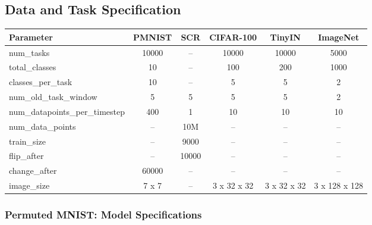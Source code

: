 \documentclass{article}
\begin{document}
\subsection{Data and Task Specification}
\vspace{2mm}
\noindent
\begin{minipage}{\columnwidth}
\centering
\footnotesize
\setlength{\tabcolsep}{3pt}

\begin{tabular}{lccccc}
\toprule
\textbf{Parameter} & \textbf{PMNIST} & \textbf{SCR} & \textbf{CIFAR-100} & \textbf{TinyIN} & \textbf{ImageNet} \\
\midrule
num\_tasks                     & 10000  & --     & 10000  & 10000  & 5000 \\
total\_classes                 & 10     & --     & 100    & 200    & 1000 \\
classes\_per\_task             & 10     & --     & 5      & 5      & 2 \\
num\_old\_task\_window         & 5      & 5      & 5      & 5      & 2 \\
num\_datapoints\_per\_timestep & 400    & 1      & 10     & 10     & 10 \\
num\_data\_points              & --     & 10M    & --     & --     & -- \\
train\_size                    & --     & 9000   & --     & --     & -- \\
flip\_after                    & --     & 10000  & --     & --     & -- \\
change\_after                  & 60000  & --     & --     & --     & -- \\
image\_size                    & 7 x 7     & --     & 3 x 32 x 32 & 3 x 32 x 32 & 3 x 128 x 128 \\
\bottomrule
\end{tabular}

\label{tab:implementation_details}

\end{minipage}


\subsubsection{Permuted MNIST: Model Specifications}
\end{document}
